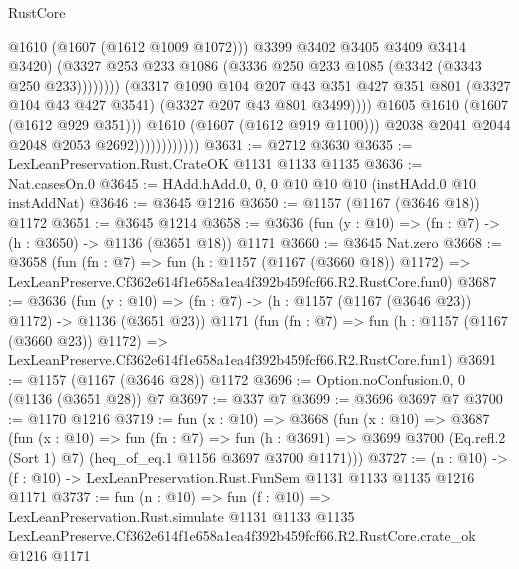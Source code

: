 \begin{lexlean}{RustCore}
\begin{coremodule}
                                                @1610
                                                (@1607 (@1612 @1009 @1072)))
                                              @3399
                                              @3402
                                              @3405
                                              @3409
                                              @3414
                                              @3420)
                                            (@3327
                                              @253
                                              @233
                                              @1086
                                              (@3336 @250 @233 @1085 (@3342 (@3343 @250 @233))))))))
                                    (@3317
                                      @1090
                                      @104
                                      @207
                                      @43
                                      @351
                                      @427
                                      @351
                                      @801
                                      (@3327 @104 @43 @427 @3541)
                                      (@3327 @207 @43 @801 @3499))))
                                @1605
                                @1610
                                (@1607 (@1612 @929 @351)))
                              @1610
                              (@1607 (@1612 @919 @1100)))
                            @2038
                            @2041
                            @2044
                            @2048
                            @2053
                            @2692))))))))))))
@3631 := @2712 @3630
@3635 := LexLeanPreservation.Rust.CrateOK @1131 @1133 @1135
@3636 := Nat.casesOn.{0}
@3645 := HAdd.hAdd.{0, 0, 0} @10 @10 @10 (instHAdd.{0} @10 instAddNat)
@3646 := @3645 @1216
@3650 := @1157 (@1167 (@3646 @18)) @1172
@3651 := @3645 @1214
@3658 := @3636 (fun (y : @10) => (fn : @7) -> (h : @3650) -> @1136 (@3651 @18)) @1171
@3660 := @3645 Nat.zero
@3668 := @3658
    (fun (fn : @7) =>
    fun (h : @1157 (@1167 (@3660 @18)) @1172) =>
    LexLeanPreserve.Cf362e614f1e658a1ea4f392b459fcf66.R2.RustCore.fun0)
@3687 := @3636
    (fun (y : @10) => (fn : @7) -> (h : @1157 (@1167 (@3646 @23)) @1172) -> @1136 (@3651 @23))
    @1171
    (fun (fn : @7) =>
    fun (h : @1157 (@1167 (@3660 @23)) @1172) =>
    LexLeanPreserve.Cf362e614f1e658a1ea4f392b459fcf66.R2.RustCore.fun1)
@3691 := @1157 (@1167 (@3646 @28)) @1172
@3696 := Option.noConfusion.{0, 0} (@1136 (@3651 @28)) @7
@3697 := @337 @7
@3699 := @3696 @3697 @7
@3700 := @1170 @1216
@3719 := fun (x : @10) =>
  @3668
    (fun (x : @10) =>
    @3687
      (fun (x : @10) =>
      fun (fn : @7) =>
      fun (h : @3691) =>
      @3699 @3700 (Eq.refl.{2} (Sort 1) @7) (heq_of_eq.{1} @1156 @3697 @3700 @1171)))
@3727 := (n : @10) -> (f : @10) -> LexLeanPreservation.Rust.FunSem @1131 @1133 @1135 @1216 @1171
@3737 := fun (n : @10) =>
  fun (f : @10) =>
  LexLeanPreservation.Rust.simulate
    @1131
    @1133
    @1135
    LexLeanPreserve.Cf362e614f1e658a1ea4f392b459fcf66.R2.RustCore.crate_ok
    @1216
    @1171
\end{coremodule}
\end{lexlean}
